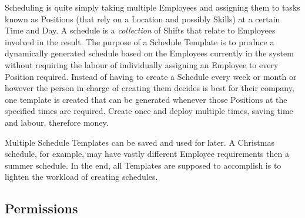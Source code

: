 \documentclass[a4paper,10pt]{report}
\begin{document}
\par \noindent \hspace*{1cm} Scheduling is quite simply taking multiple Employees and assigning them to tasks known as Positions (that rely on a Location and possibly Skills) at a certain Time and Day. A schedule is a \textit{collection} of Shifts that relate to Employees involved in the result. The purpose of a Schedule Template is to produce a dynamically generated schedule based on the Employees currently in the system without requiring the labour of individually assigning an Employee to every Position required. Instead of having to create a Schedule every week or month or however the person in charge of creating them decides is best for their company, one template is created that can be generated whenever those Positions at the specified times are required. Create once and deploy multiple times, saving time and labour, therefore money. 
\bigskip 
\par \noindent \hspace*{1cm} Multiple Schedule Templates can be saved and used for later. A Christmas schedule, for example, may have vastly different Employee requirements then a summer schedule. In the end, all Templates are supposed to accomplish is to lighten the workload of creating schedules. 

\subsection{Permissions}
\end{document}
